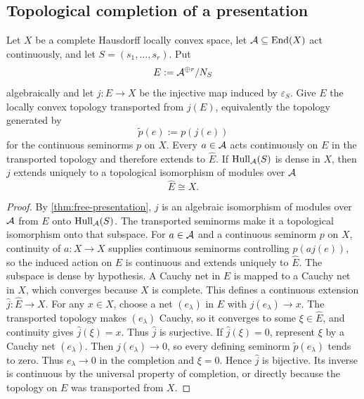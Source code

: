 \subsection{Topological completion of a presentation}
\begin{theorem}
\label{thm:completed-presentation}
Let $X$ be a complete Hausdorff locally convex space, let $\mathcal A\subseteq\operatorname{End}(X)$ act continuously, and let $S=(s_1,\ldots,s_r)$.  Put
\[
E:=\mathcal A^{\oplus r}/N_S
\]
algebraically and let $j:E\to X$ be the injective map induced by $\varepsilon_S$.  Give $E$ the locally convex topology transported from $j(E)$, equivalently the topology generated by
\[
\widetilde p(e):=p(j(e))
\]
for the continuous seminorms $p$ on $X$.  Every $a\in\mathcal A$ acts continuously on $E$ in the transported topology and therefore extends to $\widehat E$.  If $\operatorname{Hull}_{\mathcal A}(S)$ is dense in $X$, then $j$ extends uniquely to a topological isomorphism of modules over $\mathcal A$
\[
\boxed{\widehat E\cong X.}
\]
\end{theorem}

\begin{proof}
By \cref{thm:free-presentation}, $j$ is an algebraic isomorphism of modules over $\mathcal A$ from $E$ onto $\operatorname{Hull}_{\mathcal A}(S)$.  The transported seminorms make it a topological isomorphism onto that subspace.  For $a\in\mathcal A$ and a continuous seminorm $p$ on $X$, continuity of $a:X\to X$ supplies continuous seminorms controlling $p(aj(e))$, so the induced action on $E$ is continuous and extends uniquely to $\widehat E$.  The subspace is dense by hypothesis.  A Cauchy net in $E$ is mapped to a Cauchy net in $X$, which converges because $X$ is complete.  This defines a continuous extension $\widehat j:\widehat E\to X$.  For any $x\in X$, choose a net $(e_\lambda)$ in $E$ with $j(e_\lambda)\to x$.  The transported topology makes $(e_\lambda)$ Cauchy, so it converges to some $\xi\in\widehat E$, and continuity gives $\widehat j(\xi)=x$.  Thus $\widehat j$ is surjective.  If $\widehat j(\xi)=0$, represent $\xi$ by a Cauchy net $(e_\lambda)$.  Then $j(e_\lambda)\to0$, so every defining seminorm $\widetilde p(e_\lambda)$ tends to zero.  Thus $e_\lambda\to0$ in the completion and $\xi=0$.  Hence $\widehat j$ is bijective.  Its inverse is continuous by the universal property of completion, or directly because the topology on $E$ was transported from $X$.
\end{proof}

